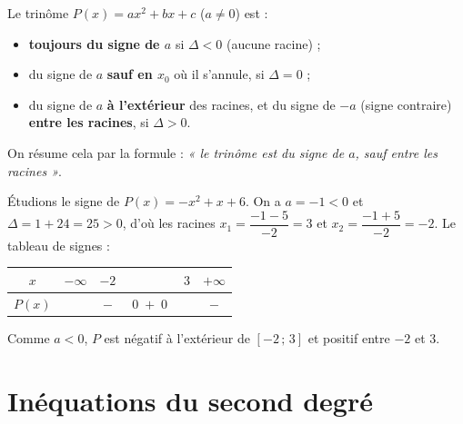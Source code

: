 \begin{theoreme}
Le trinôme $P(x)=ax^2+bx+c$ ($a\neq 0$) est :
\begin{itemize}
  \item \textbf{toujours du signe de $a$} si $\Delta<0$ (aucune racine) ;
  \item du signe de $a$ \textbf{sauf en $x_0$} où il s'annule, si $\Delta=0$ ;
  \item du signe de $a$ \textbf{à l'extérieur} des racines, et du signe de $-a$
        (signe contraire) \textbf{entre les racines}, si $\Delta>0$.
\end{itemize}
On résume cela par la formule : \emph{« le trinôme est du signe de $a$, sauf
entre les racines »}.
\end{theoreme}

\begin{illus}
\end{illus}

\begin{exemple}
Étudions le signe de $P(x)=-x^2+x+6$. On a $a=-1<0$ et
$\Delta=1+24=25>0$, d'où les racines $x_1=\dfrac{-1-5}{-2}=3$ et
$x_2=\dfrac{-1+5}{-2}=-2$. Le tableau de signes :
\begin{center}\renewcommand{\arraystretch}{1.3}
\begin{tabular}{c|ccccc}
$x$ & $-\infty$ & $-2$ & & $3$ & $+\infty$ \\
\hline
$P(x)$ & & $-$ & $\;0\;+\;0\;$ & & $-$ \\
\end{tabular}
\end{center}
Comme $a<0$, $P$ est négatif à l'extérieur de $[-2\,;\,3]$ et positif entre $-2$ et $3$.
\end{exemple}

\section{Inéquations du second degré}

